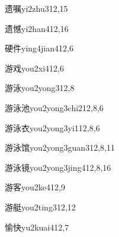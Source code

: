 \begin{verbete}{遗嘱}{yi2zhu3}{12,15}
\end{verbete}

\begin{verbete}{遗憾}{yi2han4}{12,16}
\end{verbete}

\begin{verbete}{硬件}{ying4jian4}{12,6}
\end{verbete}

\begin{verbete}{游戏}{you2xi4}{12,6}
\end{verbete}

\begin{verbete}{游泳}{you2yong3}{12,8}
\end{verbete}

\begin{verbete}{游泳池}{you2yong3chi2}{12,8,6}
\end{verbete}

\begin{verbete}{游泳衣}{you2yong3yi1}{12,8,6}
\end{verbete}

\begin{verbete}{游泳馆}{you2yong3guan3}{12,8,11}
\end{verbete}

\begin{verbete}{游泳镜}{you2yong3jing4}{12,8,16}
\end{verbete}

\begin{verbete}{游客}{you2ke4}{12,9}
\end{verbete}

\begin{verbete}{游艇}{you2ting3}{12,12}
\end{verbete}

\begin{verbete}{愉快}{yu2kuai4}{12,7}
\end{verbete}

